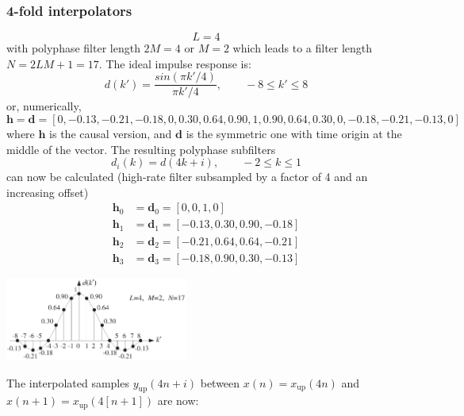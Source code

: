 \subsubsection{4-fold interpolators}
\begin{equation*}
  L = 4
\end{equation*}
with polyphase filter length $2M=4$ or $M=2$ which leads to a filter length $N=2LM+1=17$.
The ideal impulse response is:
\begin{equation*}
  d(k')=\frac{sin(\pi k'/4)}{\pi k'/4}, \qquad -8 \leq k' \leq 8
\end{equation*}
or, numerically,
\begin{equation*}
  \mathbf{h} = \mathbf{d} = [0, -0.13, -0.21, -0.18, 0, 0.30, 0.64, 0.90, 1, 0.90, 0.64, 0.30, 0, -0.18, -0.21, -0.13, 0]
\end{equation*}
where $\mathbf{h}$ is the causal version, and $\mathbf{d}$ is the symmetric one with time origin at the middle of the vector.
The resulting polyphase subfilters
\begin{equation*}
  d_i(k) = d(4k + i), \qquad -2 \leq k \leq 1
\end{equation*}
can now be calculated (high-rate filter subsampled by a factor of 4 and an increasing offset)
\begin{align*}
  \mathbf{h}_0 &= \mathbf{d}_0 = [0, 0, 1, 0] \\
  \mathbf{h}_1 &= \mathbf{d}_1 = [-0.13, 0.30, 0.90, -0.18] \\
  \mathbf{h}_2 &= \mathbf{d}_2 = [-0.21, 0.64, 0.64, -0.21] \\
  \mathbf{h}_3 &= \mathbf{d}_3 = [-0.18, 0.90, 0.30, -0.13]
\end{align*}
\begin{center}
  \includegraphics[width=6cm]{images/IntDecOv_DesignExample.png}
\end{center}
The interpolated samples $y_{\text{up}}(4n+i)$ between $x(n)=x_{\text{up}}(4n)$ and $x(n+1)=x_{\text{up}}(4[n+1])$ are now:

